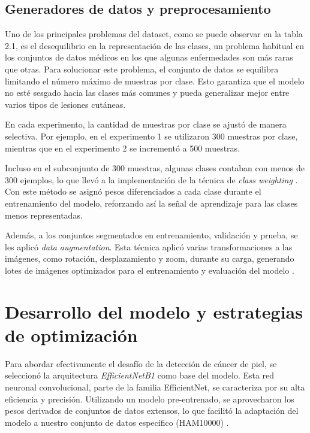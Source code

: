 \subsection{Generadores de datos y preprocesamiento}

Uno de los principales problemas del dataset, como se puede observar en la tabla 2.1, es el desequilibrio en la representación de las clases, un problema habitual en los conjuntos de datos médicos en los que algunas enfermedades son más raras que otras. Para solucionar este problema, el conjunto de datos se equilibra limitando el número máximo de muestras por clase. Esto garantiza que el modelo no esté sesgado hacia las clases más comunes y pueda generalizar mejor entre varios tipos de lesiones cutáneas. 

En cada experimento, la cantidad de muestras por clase se ajustó de manera selectiva. Por ejemplo, en el experimento 1 se utilizaron 300 muestras por clase, mientras que en el experimento 2 se incrementó a 500 muestras. 

Incluso en el subconjunto de 300 muestras, algunas clases contaban con menos de 300 ejemplos, lo que llevó a la implementación de la técnica de \textit{class weighting} . Con este método se asignó pesos diferenciados a cada clase durante el entrenamiento del modelo, reforzando así la señal de aprendizaje para las clases menos representadas.

Además, a los conjuntos segmentados en entrenamiento, validación y prueba, se les aplicó \textit{data augmentation}. Esta técnica aplicó varias transformaciones a las imágenes, como rotación, desplazamiento y zoom, durante su carga, generando lotes de imágenes optimizados para el entrenamiento y evaluación del modelo .

\section{Desarrollo del modelo y estrategias de optimización}\label{sec:method}

Para abordar efectivamente el desafío de la detección de cáncer de piel, se seleccionó la arquitectura \textit{EfficientNetB1}  como base del modelo. Esta red neuronal convolucional, parte de la familia EfficientNet, se caracteriza por su alta eficiencia y precisión. Utilizando un modelo pre-entrenado, se aprovecharon los pesos derivados de conjuntos de datos extensos, lo que facilitó la adaptación del modelo a nuestro conjunto de datos específico (HAM10000) .

